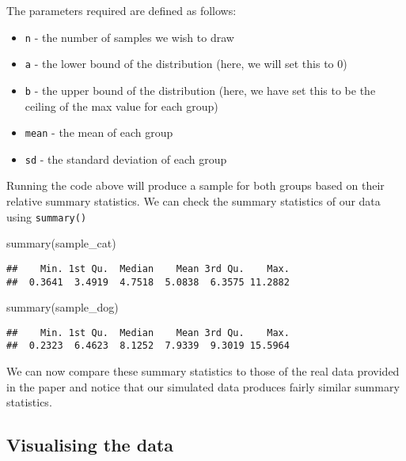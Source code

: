 \documentclass[
]{book}
\newenvironment{Shaded}{\begin{snugshade}}{\end{snugshade}}
\newcommand{\FunctionTok}[1]{\textcolor[rgb]{0.00,0.00,0.00}{#1}}
\newcommand{\NormalTok}[1]{#1}
\providecommand{\tightlist}{%
  \setlength{\itemsep}{0pt}\setlength{\parskip}{0pt}}
\begin{document}
The parameters required are defined as follows:

\begin{itemize}
\tightlist
\item
  \texttt{n} - the number of samples we wish to draw
\item
  \texttt{a} - the lower bound of the distribution (here, we will set this to 0)
\item
  \texttt{b} - the upper bound of the distribution (here, we have set this to be the ceiling of the max value for each group)
\item
  \texttt{mean} - the mean of each group
\item
  \texttt{sd} - the standard deviation of each group
\end{itemize}

Running the code above will produce a sample for both groups based on their relative summary statistics. We can check the summary statistics of our data using \texttt{summary()}

\begin{Shaded}
\begin{Highlighting}[]
\FunctionTok{summary}\NormalTok{(sample\_cat)}
\end{Highlighting}
\end{Shaded}

\begin{verbatim}
##    Min. 1st Qu.  Median    Mean 3rd Qu.    Max. 
##  0.3641  3.4919  4.7518  5.0838  6.3575 11.2882
\end{verbatim}

\begin{Shaded}
\begin{Highlighting}[]
\FunctionTok{summary}\NormalTok{(sample\_dog)}
\end{Highlighting}
\end{Shaded}

\begin{verbatim}
##    Min. 1st Qu.  Median    Mean 3rd Qu.    Max. 
##  0.2323  6.4623  8.1252  7.9339  9.3019 15.5964
\end{verbatim}

We can now compare these summary statistics to those of the real data provided in the paper and notice that our simulated data produces fairly similar summary statistics.

\hypertarget{visualising-the-data}{%
\subsection{Visualising the data}\label{visualising-the-data}}
\end{document}
